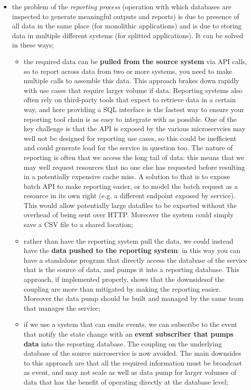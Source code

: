 \documentclass[oneside]{article}
\begin{document}
\begin{itemize}
    \item the problem of the \textit{reporting process} (operation with which databases are inspected to generate meaningful outputs and reports) is due to presence of all data in the same place (for monolithic applications) and is due to storing data in multiple different systems (for splitted applications). It can be solved in these ways;
        \begin{itemize}
            \item the required data can be \textbf{pulled from the source system} via API calls, so to report across data from two or more systems, you need to make multiple calls to assemble this data. This approach brakes down rapidly with use cases that require larger volume if data.
            \newline
            Reporting systems also often rely on third-party tools that expect to retrieve data in a certain way, and here providing a SQL interface is the fastest way to ensure your reporting tool chain is as easy to integrate with as possible. One of the key challenge is that the API is exposed by the various microservcies may well not be designed for reporting use cases, so this could be inefficient and could generate load for the service in question too.
            \newline
            The nature of reporting is often that we access the long tail of data: this means that we may well request resources that no one else has requested before resulting in a potentially expensive cache miss. A solution to that is to expose batch API to make reporting easier, or to model the batch request as a resource in its own right (e.g. a different endpoint exposed by service). This would allow potentially large datafiles to be exported without the overhead of being sent over HTTP. Moreover the system could simply save a CSV file to a shared location;
            \item rather than have the reporting system pull the data, we could instead have the \textbf{data pushed to the reporting system}: in this way you can have a standalone program that directly access the database of the service that is the source of data, and pumps it into a reporting database. This approach, if implemented properly, shows that the downsidesof the coupling are more than mitigated by making the reporting easier. Moreover the data pump should be built and managed by the same team that manages the service;
            \item if we use a system that can emits events, we can subscribe to the event that notify the state change with an \textbf{event subscriber that pumps data} into the reporting database. The coupling on the underlying database of the source microservice is now avoided. The main downsides to this approach are that all the required information must be broadcast as event, and may not scale as well as data pump for larger volumes of data that has the benefit of operating directly at the database level;

\end{itemize}
\end{itemize}
\end{document}
